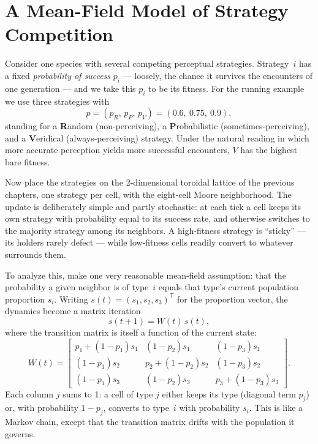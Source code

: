 \section{A Mean-Field Model of Strategy Competition}
\label{sec:meanfield}

Consider one species with several competing perceptual strategies.
Strategy~$i$ has a fixed \emph{probability of success} $p_i$ ---
loosely, the chance it survives the encounters of one generation --- and
we take this $p_i$ to be its fitness.  For the running example we use
three strategies with
\[
  p = (p_R,\, p_P,\, p_V) = (0.6,\ 0.75,\ 0.9),
\]
standing for a \textbf{R}andom (non-perceiving), a \textbf{P}robabilistic
(sometimes-perceiving), and a \textbf{V}eridical (always-perceiving)
strategy.  Under the natural reading in which more accurate perception
yields more successful encounters, $V$ has the highest bare fitness.

Now place the strategies on the 2-dimensional toroidal lattice of the
previous chapters, one strategy per cell, with the eight-cell Moore
neighborhood.  The update is deliberately simple and partly stochastic:
at each tick a cell keeps its own strategy with probability equal to its
success rate, and otherwise switches to the majority strategy among its
neighbors.  A high-fitness strategy is ``sticky'' --- its holders rarely
defect --- while low-fitness cells readily convert to whatever surrounds
them.

To analyze this, make one very reasonable mean-field assumption: that the
probability a given neighbor is of type~$i$ equals that type's current
population proportion $s_i$.  Writing $s(t) = (s_1, s_2, s_3)^{\mathsf T}$
for the proportion vector, the dynamics become a matrix iteration
\begin{equation}
  s(t+1) = W(t)\, s(t),
  \label{eq:meanfield}
\end{equation}
where the transition matrix is itself a function of the current state:
\begin{equation}
  W(t) =
  \begin{bmatrix}
    p_1 + (1-p_1)s_1 & (1-p_2)s_1 & (1-p_3)s_1\\
    (1-p_1)s_2 & p_2 + (1-p_2)s_2 & (1-p_3)s_2\\
    (1-p_1)s_3 & (1-p_2)s_3 & p_3 + (1-p_3)s_3
  \end{bmatrix}.
\end{equation}
Each column $j$ sums to 1: a cell of type $j$ either keeps its type
(diagonal term $p_j$) or, with probability $1-p_j$, converts to
type~$i$ with probability $s_i$.  This is like a Markov chain, except
that the transition matrix drifts with the population it governs.

